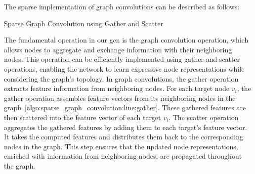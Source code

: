 The sparse implementation of graph convolutions can be described as follows:
\begin{algorithm}[H]
    \caption{Sparse Graph Convolution using Gather and Scatter\label{algo:sparse_graph_convolution}}
    \begin{algorithmic}[1]
         \label{algo:sparse_graph_convolution:line:gather}
         \label{algo:sparse_graph_convolution:line:scatter}
        \EndFunction{}
    \end{algorithmic}
\end{algorithm}

The fundamental operation in our \ac{gcn} is the graph convolution operation, which allows nodes to aggregate and exchange information with their neighboring nodes.
This operation can be efficiently implemented using gather and scatter operations, enabling the network to learn expressive node representations while considering the graph's topology.
In graph convolutions, the gather operation extracts feature information from neighboring nodes.
For each target node $v_{i}$, the gather operation assembles feature vectors from its neighboring nodes in the graph~\ref{algo:sparse_graph_convolution:line:gather}.
These gathered features are then scattered into the feature vector of each target $v_{i}$.
The scatter operation aggregates the gathered features by adding them to each target's feature vector.
It takes the computed features and distributes them back to the corresponding nodes in the graph.
This step ensures that the updated node representations, enriched with information from neighboring nodes, are propagated throughout the graph.

